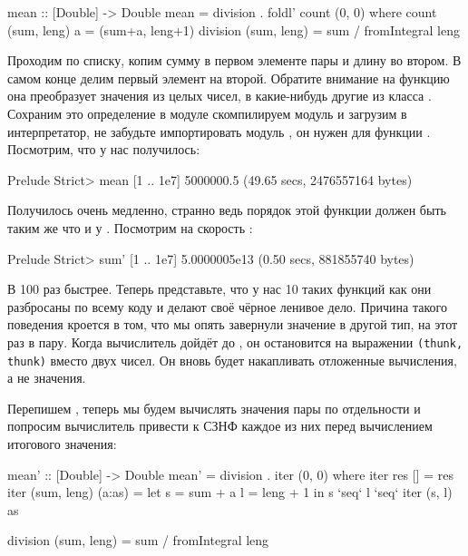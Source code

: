 \begin{code}
mean :: [Double] -> Double
mean = division . foldl' count (0, 0)
    where count  (sum, leng) a = (sum+a, leng+1)
          division (sum, leng) = sum / fromIntegral leng
\end{code}

Проходим по списку, копим сумму в первом элементе пары и
длину во втором. В самом конце делим первый элемент на второй.
Обратите внимание на функцию  она преобразует
значения из целых чисел, в какие-нибудь другие из класса .
Сохраним это определение в модуле  скомпилируем
модуль и загрузим в интерпретатор, не забудьте импортировать
модуль , он нужен для функции . 
Посмотрим, что у нас получилось:


\begin{code}
Prelude Strict> mean [1 .. 1e7]
5000000.5
(49.65 secs, 2476557164 bytes)
\end{code}

Получилось очень медленно, странно ведь порядок этой функции
должен быть таким же что и у . Посмотрим на скорость :

\begin{code}
Prelude Strict> sum' [1 .. 1e7]
5.0000005e13
(0.50 secs, 881855740 bytes)
\end{code}

В 100 раз быстрее. Теперь представьте, что у нас 10 таких функций
как  они разбросаны по всему коду и делают своё чёрное 
ленивое дело. Причина такого поведения кроется в том, что мы
опять завернули значение в другой тип, на этот раз в пару.
Когда вычислитель дойдёт до , он остановится на 
выражении \verb!(thunk, thunk)! вместо двух чисел. Он вновь будет 
накапливать отложенные вычисления, а не значения.

Перепишем , теперь мы будем вычислять значения
пары по отдельности и попросим вычислитель привести
к СЗНФ каждое из них перед вычислением итогового значения:

\begin{code}
mean' :: [Double] -> Double
mean' = division . iter (0, 0)
    where iter res          []      = res
          iter (sum, leng)  (a:as)  = 
                let s = sum  + a
                    l = leng + 1
                in  s `seq` l `seq` iter (s, l) as
          
          division (sum, leng) = sum / fromIntegral leng
\end{code}

